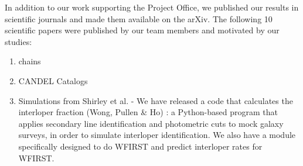 In addition to our work supporting the Project Office, we published our results in scientific journals and made them available on the arXiv. The following 10 scientific papers were published by our team members and motivated by our studies:

\begin{enumerate}
\item \CoLi chains
\item CANDEL Catalogs
\item Simulations from Shirley et al.  - We have released a code that calculates the interloper fraction (Wong, Pullen \& Ho) : a Python-based program that applies secondary line identification and photometric cuts to mock galaxy surveys, in order to simulate interloper identification.  We also have a module specifically designed to do WFIRST and predict interloper rates for WFIRST. \citet{Wong:2016eku}
\end{enumerate}
